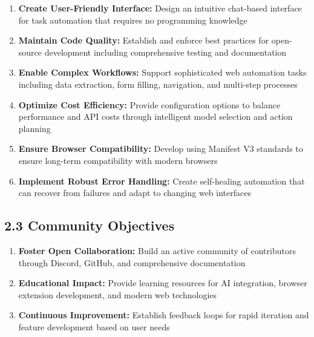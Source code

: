 \documentclass[12pt,a4paper]{article}
\begin{document}
\begin{enumerate}
    \item \textbf{Create User-Friendly Interface:} Design an intuitive chat-based interface for task automation that requires no programming knowledge
    
    \item \textbf{Maintain Code Quality:} Establish and enforce best practices for open-source development including comprehensive testing and documentation
    
    \item \textbf{Enable Complex Workflows:} Support sophisticated web automation tasks including data extraction, form filling, navigation, and multi-step processes
    
    \item \textbf{Optimize Cost Efficiency:} Provide configuration options to balance performance and API costs through intelligent model selection and action planning
    
    \item \textbf{Ensure Browser Compatibility:} Develop using Manifest V3 standards to ensure long-term compatibility with modern browsers
    
    \item \textbf{Implement Robust Error Handling:} Create self-healing automation that can recover from failures and adapt to changing web interfaces
\end{enumerate}

\vspace{0.3cm}

\subsection*{\textbf{2.3 Community Objectives}}

\begin{enumerate}
    \item \textbf{Foster Open Collaboration:} Build an active community of contributors through Discord, GitHub, and comprehensive documentation
    
    \item \textbf{Educational Impact:} Provide learning resources for AI integration, browser extension development, and modern web technologies
    
    \item \textbf{Continuous Improvement:} Establish feedback loops for rapid iteration and feature development based on user needs
\end{enumerate}
\end{document}

